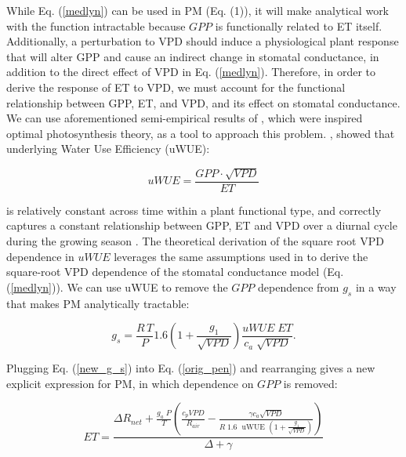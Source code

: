   While Eq. (\ref{medlyn}) can be used in PM (Eq. (1)), it will make
  analytical work with the function intractable because $GPP$ is
  functionally related to ET itself. Additionally, a perturbation to
  VPD should induce a physiological plant response that will alter GPP
  and cause an indirect change in stomatal conductance, in addition to
  the direct effect of VPD in Eq. (\ref{medlyn}). Therefore, in order
  to derive the response of ET to VPD, we must account for the
  functional relationship between GPP, ET, and VPD, and its effect on
  stomatal conductance. We can use aforementioned semi-empirical
  results of \citet{Zhou_2015}, which were inspired optimal
  photosynthesis theory, as a tool to approach this
  problem. \citet{Zhou_2015}, showed that underlying Water Use
  Efficiency (uWUE):

  \begin{equation}
    uWUE = \frac{GPP \cdot \sqrt{VPD}}{ET}
    \label{uwue}
  \end{equation}

  is relatively constant across time within a plant functional type,
  and correctly captures a constant relationship between GPP, ET and
  VPD over a diurnal cycle during the growing season
  \citep{Zhou_2014}. The theoretical derivation of the square root VPD
  dependence in $uWUE$ leverages the same assumptions used in
  \cite{MEDLYN_2011} to derive the square-root VPD dependence of the
  stomatal conductance model (Eq.  (\ref{medlyn})).  We can use uWUE
  to remove the $GPP$ dependence from $g_s$ in a way that makes PM
  analytically tractable:

  \begin{equation}
    g_s = \frac{R \, T}{P} 1.6 \left(1 + \frac{g_1}{\sqrt{VPD}}\right) \frac{uWUE \; ET}{c_a \; \sqrt{VPD}}.
    \label{new_g_s}
  \end{equation}

Plugging Eq. (\ref{new_g_s}) into Eq. (\ref{orig_pen}) and
rearranging gives a new explicit expression for PM, in which
dependence on $GPP$ is removed:

  \begin{equation}
    ET = \frac{\Delta R_{net} + \frac{g_a\; P}{T} \left( \frac{ c_p VPD}{R_{air}} -  \frac{\gamma c_a \sqrt{VPD} }{ R \; 1.6\; \text{ uWUE } (1 + \frac{g_1}{\sqrt{VPD}})} \right) }{ \Delta + \gamma}
    \label{et}
  \end{equation}

